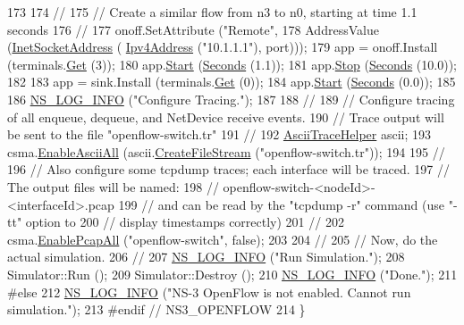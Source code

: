 \begin{DoxyCode}
173 
174   \textcolor{comment}{//}
175   \textcolor{comment}{// Create a similar flow from n3 to n0, starting at time 1.1 seconds}
176   \textcolor{comment}{//}
177   onoff.SetAttribute (\textcolor{stringliteral}{"Remote"},
178                       AddressValue (\hyperlink{classns3_1_1InetSocketAddress}{InetSocketAddress} (
      \hyperlink{classns3_1_1Ipv4Address}{Ipv4Address} (\textcolor{stringliteral}{"10.1.1.1"}), port)));
179   app = onoff.Install (terminals.\hyperlink{classns3_1_1NodeContainer_a9ed96e2ecc22e0f5a3d4842eb9bf90bf}{Get} (3));
180   app.\hyperlink{classns3_1_1ApplicationContainer_a8eff87926507020bbe3e1390358a54a7}{Start} (\hyperlink{group__timecivil_ga33c34b816f8ff6628e33d5c8e9713b9e}{Seconds} (1.1));
181   app.\hyperlink{classns3_1_1ApplicationContainer_adfc52f9aa4020c8714679b00bbb9ddb3}{Stop} (\hyperlink{group__timecivil_ga33c34b816f8ff6628e33d5c8e9713b9e}{Seconds} (10.0));
182 
183   app = sink.Install (terminals.\hyperlink{classns3_1_1NodeContainer_a9ed96e2ecc22e0f5a3d4842eb9bf90bf}{Get} (0));
184   app.\hyperlink{classns3_1_1ApplicationContainer_a8eff87926507020bbe3e1390358a54a7}{Start} (\hyperlink{group__timecivil_ga33c34b816f8ff6628e33d5c8e9713b9e}{Seconds} (0.0));
185 
186   \hyperlink{group__logging_gafbd73ee2cf9f26b319f49086d8e860fb}{NS\_LOG\_INFO} (\textcolor{stringliteral}{"Configure Tracing."});
187 
188   \textcolor{comment}{//}
189   \textcolor{comment}{// Configure tracing of all enqueue, dequeue, and NetDevice receive events.}
190   \textcolor{comment}{// Trace output will be sent to the file "openflow-switch.tr"}
191   \textcolor{comment}{//}
192   \hyperlink{classns3_1_1AsciiTraceHelper}{AsciiTraceHelper} ascii;
193   csma.\hyperlink{classns3_1_1AsciiTraceHelperForDevice_a63e57c878526c732924e14c1e52cca8b}{EnableAsciiAll} (ascii.\hyperlink{classns3_1_1AsciiTraceHelper_a44960bf2ca32835024eaedd26d1c4f94}{CreateFileStream} (\textcolor{stringliteral}{"openflow-switch.tr"}));
194 
195   \textcolor{comment}{//}
196   \textcolor{comment}{// Also configure some tcpdump traces; each interface will be traced.}
197   \textcolor{comment}{// The output files will be named:}
198   \textcolor{comment}{//     openflow-switch-<nodeId>-<interfaceId>.pcap}
199   \textcolor{comment}{// and can be read by the "tcpdump -r" command (use "-tt" option to}
200   \textcolor{comment}{// display timestamps correctly)}
201   \textcolor{comment}{//}
202   csma.\hyperlink{classns3_1_1PcapHelperForDevice_a4ab183a2512120200d4a0e5d8ececd49}{EnablePcapAll} (\textcolor{stringliteral}{"openflow-switch"}, \textcolor{keyword}{false});
203 
204   \textcolor{comment}{//}
205   \textcolor{comment}{// Now, do the actual simulation.}
206   \textcolor{comment}{//}
207   \hyperlink{group__logging_gafbd73ee2cf9f26b319f49086d8e860fb}{NS\_LOG\_INFO} (\textcolor{stringliteral}{"Run Simulation."});
208   Simulator::Run ();
209   Simulator::Destroy ();
210   \hyperlink{group__logging_gafbd73ee2cf9f26b319f49086d8e860fb}{NS\_LOG\_INFO} (\textcolor{stringliteral}{"Done."});
211 \textcolor{preprocessor}{  #else}
212   \hyperlink{group__logging_gafbd73ee2cf9f26b319f49086d8e860fb}{NS\_LOG\_INFO} (\textcolor{stringliteral}{"NS-3 OpenFlow is not enabled. Cannot run simulation."});
213 \textcolor{preprocessor}{  #endif // NS3\_OPENFLOW}
214 \}
\end{DoxyCode}


